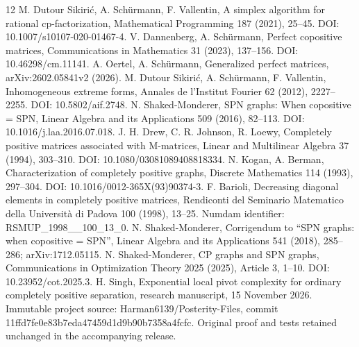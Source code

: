 \documentclass[11pt]{article}
\theoremstyle{definition}\newtheorem{definition}[theorem]{Definition}
\theoremstyle{remark}\newtheorem{remark}[theorem]{Remark}
\begin{document}
\begingroup\small
\begin{thebibliography}{12}
\setlength{\itemsep}{3pt}
 M. Dutour Sikiri\'c, A. Sch\"urmann, F. Vallentin, A simplex algorithm for rational cp-factorization, Mathematical Programming 187 (2021), 25--45. DOI: 10.1007/s10107-020-01467-4.
 V. Dannenberg, A. Sch\"urmann, Perfect copositive matrices, Communications in Mathematics 31 (2023), 137--156. DOI: 10.46298/cm.11141.
 A. Oertel, A. Sch\"urmann, Generalized perfect matrices, arXiv:2602.05841v2 (2026).
 M. Dutour Sikiri\'c, A. Sch\"urmann, F. Vallentin, Inhomogeneous extreme forms, Annales de l'Institut Fourier 62 (2012), 2227--2255. DOI: 10.5802/aif.2748.
 N. Shaked-Monderer, SPN graphs: When copositive = SPN, Linear Algebra and its Applications 509 (2016), 82--113. DOI: 10.1016/j.laa.2016.07.018.
 J. H. Drew, C. R. Johnson, R. Loewy, Completely positive matrices associated with M-matrices, Linear and Multilinear Algebra 37 (1994), 303--310. DOI: 10.1080/03081089408818334.
 N. Kogan, A. Berman, Characterization of completely positive graphs, Discrete Mathematics 114 (1993), 297--304. DOI: 10.1016/0012-365X(93)90374-3.
 F. Barioli, Decreasing diagonal elements in completely positive matrices, Rendiconti del Seminario Matematico della Universit\`a di Padova 100 (1998), 13--25. Numdam identifier: RSMUP\_1998\_\_100\_13\_0.
 N. Shaked-Monderer, Corrigendum to ``SPN graphs: when copositive = SPN'', Linear Algebra and its Applications 541 (2018), 285--286; arXiv:1712.05115.
 N. Shaked-Monderer, CP graphs and SPN graphs, Communications in Optimization Theory 2025 (2025), Article 3, 1--10. DOI: 10.23952/cot.2025.3.
 H. Singh, Exponential local pivot complexity for ordinary completely positive separation, research manuscript, 15 November 2026. Immutable project source: Harman6139/Posterity-Files, commit 11ffd7fe0e83b7eda47459d1d9b90b7358a4fcfc. Original proof and tests retained unchanged in the accompanying release.
\end{thebibliography}
\endgroup
\end{document}
